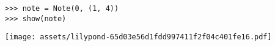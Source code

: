 \begin{comment}
<abjad>
note = Note(0, (1, 4))
show(note)
</abjad>
\end{comment}

\begin{lstlisting}
>>> note = Note(0, (1, 4))
>>> show(note)
\end{lstlisting}
\noindent\texttt{[image: assets/lilypond-65d03e56d1fdd997411f2f04c401fe16.pdf]}
